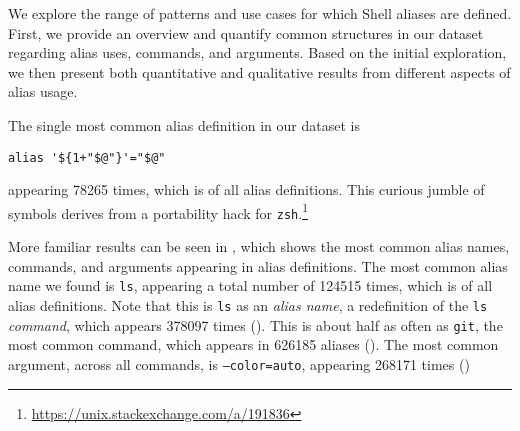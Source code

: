 We explore the range of patterns and use cases for which Shell aliases are defined.
First, we provide an overview and quantify common structures in our dataset regarding alias uses, commands, and arguments.
Based on the initial exploration, we then present both quantitative and qualitative results from different aspects of alias usage.

The single most common alias definition in our dataset is
\begin{verbatim}
alias '${1+"$@"}'="$@"
\end{verbatim}
appearing \num{78265} times, which is  of all alias definitions.
This curious jumble of symbols derives from a portability hack for \texttt{zsh}.\footnote{\url{https://unix.stackexchange.com/a/191836}}

More familiar results can be seen in , which shows the most common alias names, commands, and arguments appearing in alias definitions.
The most common alias name we found is \texttt{ls}, appearing a total number of \num{124515} times, which is  of all alias definitions.
Note that this is \texttt{ls} as an \emph{alias name}, a redefinition of the \texttt{ls} \emph{command}, which appears \num{378097} times ().
This is about half as often as \texttt{git}, the most common command, which appears in \num{626185} aliases ().
The most common argument, across all commands, is \texttt{--color=auto}, appearing \num{268171} times ()

